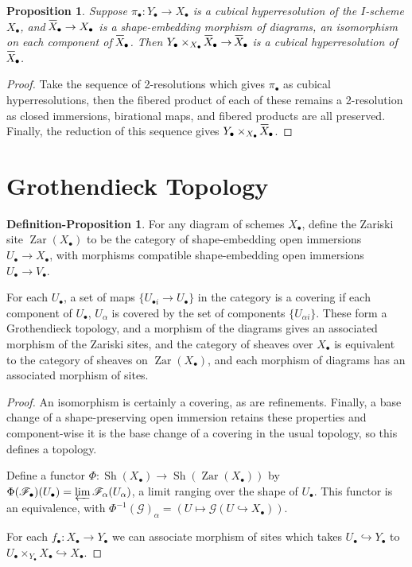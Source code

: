 \documentclass{report}
\newtheorem{prop}[theorem]{Proposition}
\theoremstyle{definition}
\newtheorem{defprop}[theorem]{Definition-Proposition}
\DeclareMathOperator{\Sh}{Sh}
\DeclareMathOperator{\Zar}{Zar}
\newcommand{\FF}{\mathscr{F}}
\newcommand{\GG}{\mathscr{G}}
\newcommand*\xbar[1]{%
  \hbox{%
    \vbox{%
      \hrule height 0.5pt %
      \kern0.5ex%
      \hbox{%
        \kern-0.1em%
        \ensuremath{#1}%
        \kern-0.1em%
      }%
    }%
  }%
}
\begin{document}
\begin{prop}
	Suppose $\pi_\bullet : Y_\bullet \rightarrow X_\bullet$ is a cubical hyperresolution of the $I$-scheme $X_\bullet$, and $\xbar{X}_\bullet \rightarrow X_\bullet$ is a shape-embedding morphism of diagrams, an isomorphism on each component of $\xbar{X}_\bullet$.
	Then $Y_\bullet \times_{X_\bullet} \xbar{X}_\bullet \rightarrow \xbar{X}_\bullet$ is a cubical hyperresolution of $\xbar{X}_\bullet$.
\end{prop}
\begin{proof}
	Take the sequence of 2-resolutions which gives $\pi_\bullet$ as cubical hyperresolutions, then the fibered product of each of these remains a 2-resolution as closed immersions, birational maps, and fibered products are all preserved.
	Finally, the reduction of this sequence gives $Y_\bullet \times_{X_\bullet} \xbar{X}_\bullet$.
\end{proof}
	
\section{Grothendieck Topology}
\begin{defprop}
	For any diagram of schemes $X_\bullet$, define the Zariski site $\Zar(X_\bullet)$ to be the category of shape-embedding open immersions $U_\bullet \rightarrow X_\bullet$, with morphisms compatible shape-embedding open immersions $U_\bullet \rightarrow V_\bullet$.
	
	For each $U_\bullet$, a set of maps $\{U_{\bullet i} \rightarrow U_\bullet\}$ in the category is a covering if each component of $U_\bullet$, $U_\alpha$ is covered by the set of components $\{U_{\alpha i}\}$.
	These form a Grothendieck topology, and a morphism of the diagrams gives an associated morphism of the Zariski sites, and the category of sheaves over $X_\bullet$ is equivalent to the category of sheaves on $\Zar(X_\bullet)$, and each morphism of diagrams has an associated morphism of sites.
\end{defprop}
\begin{proof}
	An isomorphism is certainly a covering, as are refinements.
	Finally, a base change of a shape-preserving open immersion retains these properties and component-wise it is the base change of a covering in the usual topology, so this defines a topology.
	
	Define a functor $\Phi : \Sh(X_\bullet) \rightarrow \Sh(\Zar(X_\bullet))$ by $\Phi(\FF_\bullet)(U_\bullet) = \varprojlim  \FF_{\alpha}(U_\alpha)$, a limit ranging over the shape of $U_\bullet$.
	This functor is an equivalence, with $\Phi^{-1}(\GG)_\alpha = (U \mapsto \GG(U \hookrightarrow X_\bullet))$.
	
	For each $f_\bullet : X_\bullet \rightarrow Y_\bullet$ we can associate morphism of sites which takes $U_\bullet \hookrightarrow Y_\bullet$ to $U_\bullet \times_{Y_\bullet} X_\bullet \hookrightarrow X_\bullet$.
\end{proof}
\end{document}
